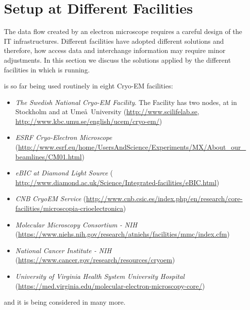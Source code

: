 \section{\scipion Setup at Different Facilities}

The data flow created by an electron microscope requires a careful design of the IT infrastructures.  Different facilities have adopted different solutions and therefore, how \scipion  access data and interchange information may require minor adjustments. In this section we discuss  the  solutions applied by the different facilities in which \scipion is running.

\scipion is so far being used routinely in eight Cryo-EM facilities:
\begin{itemize}
 \itemsep0em 

 \item \emph{The Swedish National Cryo-EM Facility}. The Facility has two nodes, at \scilifelab in Stockholm and at Ume\aa\ University (\url{http://www.scilifelab.se}, \url{http://www.kbc.umu.se/english/ucem/cryo-em/})
 \item \emph{ESRF Cryo-Electron Microscope} (\url{http://www.esrf.eu/home/UsersAndScience/Experiments/MX/About_our_beamlines/CM01.html})
 \item \emph{eBIC at Diamond Light Source} ( \url{http://www.diamond.ac.uk/Science/Integrated-facilities/eBIC.html})
 \item \emph{CNB CryoEM Service} (\url{http://www.cnb.csic.es/index.php/en/research/core-facilities/microscopia-crioelectronica})
 \item \emph{Molecular Microscopy Consortium - NIH} (\url{https://www.niehs.nih.gov/research/atniehs/facilities/mmc/index.cfm})
 \item \emph{National Cancer Institute - NIH} (\url{https://www.cancer.gov/research/resources/cryoem})
 \item \emph{University of Virginia Health System University Hospital} (\url{https://med.virginia.edu/molecular-electron-microscopy-core/})
 
\end{itemize}
and it is being considered in many more.

